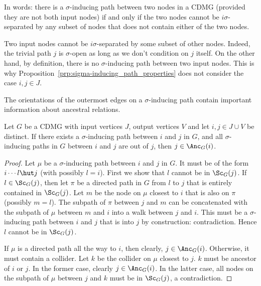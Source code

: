 In words: there is a $\sigma$-inducing path between two nodes in a CDMG (provided they are not both input nodes) if and only if the two nodes cannot be $i\sigma$-separated by any subset of nodes that does not contain either of the two nodes.
\begin{Rem}
Two input nodes cannot be $i\sigma$-separated by some subset of other nodes.
Indeed, the trivial path $j$ is $\sigma$-open as long as we don't condition on $j$ itself.
On the other hand, by definition, there is no $\sigma$-inducing path between two input nodes.
This is why Proposition~\ref{prp:sigma-inducing_path_properties} does not consider the case $i,j \in J$.
\end{Rem}

The orientations of the outermost edges on a $\sigma$-inducing path contain important information about ancestral relations.
\begin{Lem}\label{lem:sigma-inducing_path_out-of}
  Let $G$ be a CDMG with input vertices $J$, output vertices $V$ and let $i,j \in J \cup V$ be distinct. 
  If there exists a $\sigma$-inducing path between $i$ and $j$ in $G$,
  and all $\sigma$-inducing paths in $G$ between $i$ and $j$ are out of $j$, then $j \in \Anc_G(i)$.
\end{Lem}
\begin{proof}
  Let $\mu$ be a $\sigma$-inducing path between $i$ and $j$ in $G$. 
  It must be of the form $i \cdots l \hut j$ (with possibly $l = i$). 
  First we show that $l$ cannot be in $\Sc_G(j)$.
  If $l \in \Sc_G(j)$, then let $\pi$ be a directed path in $G$ from $l$ to $j$ that is entirely contained in $\Sc_G(j)$.
  Let $m$ be the node on $\mu$ closest to $i$ that is also on $\pi$ (possibly $m = l$).
  The subpath of $\pi$ between $j$ and $m$ can be concatenated with the subpath of $\mu$ between $m$ and $i$ into a walk between $j$ and $i$.
  This must be a $\sigma$-inducing path between $i$ and $j$ that is into $j$ by construction: contradiction.
  Hence $l$ cannot be in $\Sc_G(j)$.

  If $\mu$ is a directed path all the way to $i$, then clearly, $j \in \Anc_G(i)$.
  Otherwise, it must contain a collider. 
  Let $k$ be the collider on $\mu$ closest to $j$.
  $k$ must be ancestor of $i$ or $j$.
  In the former case, clearly $j \in \Anc_G(i)$.
  In the latter case, all nodes on the subpath of $\mu$ between $j$ and $k$ must be in $\Sc_G(j)$, a contradiction.
\end{proof}

